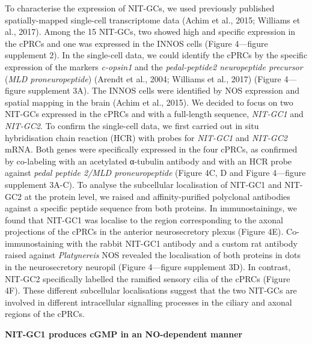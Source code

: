 \documentclass[
  10pt,
  onecolumn]{article}
\begin{document}
To characterise the expression of NIT-GCs, we used previously published
spatially-mapped single-cell transcriptome data (Achim et al., 2015;
Williams et al., 2017). Among the 15 NIT-GCs, two showed high and
specific expression in the cPRCs and one was expressed in the INNOS
cells (Figure 4---figure supplement 2). In the single-cell data, we
could identify the cPRCs by the specific expression of the markers
\emph{c-opsin1} and the \emph{pedal-peptide2 neuropeptide precursor}
(\emph{MLD proneuropeptide}) (Arendt et al., 2004; Williams et al.,
2017) (Figure 4---figure supplement 3A). The INNOS cells were identified
by NOS expression and spatial mapping in the brain (Achim et al., 2015).
We decided to focus on two NIT-GCs expressed in the cPRCs and with a
full-length sequence, \emph{NIT-GC1} and \emph{NIT-GC2}. To confirm the
single-cell data, we first carried out in situ hybridisation chain
reaction (HCR) with probes for \emph{NIT-GC1} and \emph{NIT-GC2} mRNA.
Both genes were specifically expressed in the four cPRCs, as confirmed
by co-labeling with an acetylated α-tubulin antibody and with an HCR
probe against \emph{pedal peptide 2/MLD proneuropeptide} (Figure 4C, D
and Figure 4---figure supplement 3A-C). To analyse the subcellular
localisation of NIT-GC1 and NIT-GC2 at the protein level, we raised and
affinity-purified polyclonal antibodies against a specific peptide
sequence from both proteins. In immunostainings, we found that NIT-GC1
was localise to the region corresponding to the axonal projections of
the cPRCs in the anterior neurosecretory plexus (Figure 4E).
Co-immunostaining with the rabbit NIT-GC1 antibody and a custom rat
antibody raised against \emph{Platynereis} NOS revealed the localisation
of both proteins in dots in the neurosecretory neuropil (Figure
4---figure supplement 3D). In contrast, NIT-GC2 specifically labelled
the ramified sensory cilia of the cPRCs (Figure 4F). These different
subcellular localisations suggest that the two NIT-GCs are involved in
different intracellular signalling processes in the ciliary and axonal
regions of the cPRCs.

\textbf{NIT-GC1 produces cGMP in an NO-dependent manner}
\end{document}
